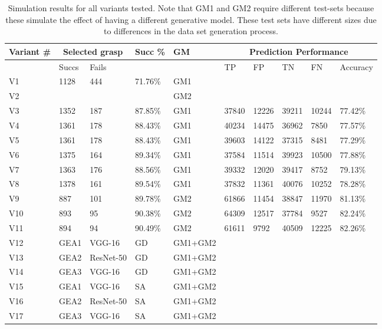 \begin{table}[]
\centering
\begin{tabular}{|l|l|l|l|l|l|l|l|l|l|}
\hline
Variant \# & \multicolumn{2}{|c|}{Selected grasp} &  Succ \% &  GM & \multicolumn{5}{|c|}{Prediction Performance} \\ \hline
 & Succs & Fails &  &  & TP & FP & TN & FN & Accuracy \\ \hline
V1 & 1128   & 444 & 71.76\% & GM1 & & & & & \\ \hline
V2 &     &  & & GM2 & & & & & \\ \hline
V3 & 1352 & 187 & 87.85\% & GM1 & 37840 &	12226 & 39211 & 10244 & 77.42\% \\ \hline
V4 &  1361 & 178 & 88.43\%& GM1 & 40234 &	14475 & 36962 & 7850 & 77.57\% \\ \hline
V5 & 1361 & 178 & 88.43\%& GM1 & 39603 & 14122 &37315 & 8481	& 77.29\% \\ \hline
V6 & 1375 & 164 & 89.34\% & GM1 & 37584 &	11514 & 39923 &10500	& 77.88\% \\ \hline
V7 & 1363 & 176 & 88.56\% & GM1 & 39332 &	12020 & 39417 & 8752 & 79.13\% \\ \hline
V8 & 1378 & 161 & 89.54\%& GM1 & 37832 &	11361 & 40076	& 10252 & 78.28\% \\ \hline
V9 & 887 & 101 & 89.78\% & GM2 & 61866 &	11454& 38847& 11970 & 81.13\% \\ \hline
V10 & 893 & 95 & 90.38\%& GM2 & 64309 &	12517 & 37784 & 9527 & 82.24\% \\ \hline
V11 & 894 & 94 & 90.49\% & GM2 & 61611 & 9792 & 40509 & 12225 & 82.26\% \\ \hline
V12 & GEA1 & VGG-16 & GD & GM1+GM2 & & & & & \\ \hline
V13 & GEA2 & ResNet-50 & GD & GM1+GM2 & & & & & \\ \hline
V14 & GEA3 & VGG-16 & GD & GM1+GM2 & & & & & \\ \hline
V15 & GEA1 & VGG-16 & SA & GM1+GM2 & & & & & \\ \hline
V16 & GEA2 & ResNet-50 & SA & GM1+GM2 & & & & & \\ \hline
V17 & GEA3 & VGG-16 & SA & GM1+GM2 & & & & & \\ \hline
\end{tabular}
\caption{Simulation results for all variants tested. Note that GM1 and GM2 require different test-sets because these simulate the effect of having a different generative model. These test sets have different sizes due to differences in the data set generation process.}
\label{table:Results-sim}
\end{table}


